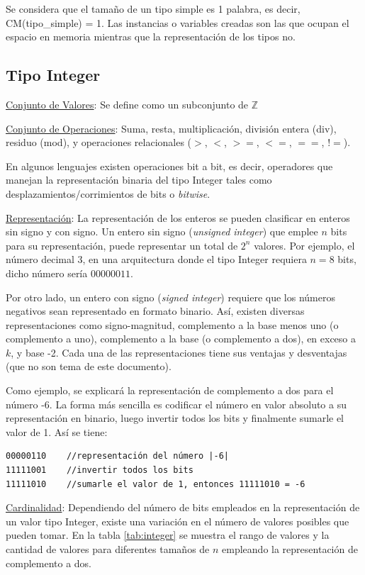 Se considera que el tamaño de un tipo simple es 1 palabra, es decir, CM(tipo\_simple) = 1. Las instancias o variables creadas son las que ocupan el espacio en memoria mientras que la representación de los tipos no.

\subsection{Tipo Integer}

\underline{Conjunto de Valores}: Se define como un subconjunto de $\mathbb{Z}$

\underline{Conjunto de Operaciones}: Suma, resta, multiplicación, división entera (div), residuo (mod), y operaciones relacionales ($>$, $<$, $>=$, $<=$, $==$, $!=$).

En algunos lenguajes existen operaciones bit a bit, es decir, operadores que manejan la representación binaria del tipo Integer tales como desplazamientos/corrimientos de bits o \textit{bitwise}.

\underline{Representación}: La representación de los enteros se pueden clasificar en enteros sin signo y con signo. Un entero sin signo (\textit{unsigned integer}) que emplee $n$ bits para su representación, puede representar un total de $2^n$ valores. Por ejemplo, el número decimal 3, en una arquitectura donde el tipo Integer requiera $n=8$ bits, dicho número sería $00000011$.

Por otro lado, un entero con signo (\textit{signed integer}) requiere que los números negativos sean representado en formato binario. Así, existen diversas representaciones como signo-magnitud, complemento a la base menos uno (o complemento a uno), complemento a la base (o complemento a dos), en exceso a $k$, y base -2. Cada una de las representaciones tiene sus ventajas y desventajas (que no son tema de este documento).

Como ejemplo, se explicará la representación de complemento a dos para el número -6. La forma más sencilla es codificar el número en valor absoluto a su representación en binario, luego invertir todos los bits y finalmente sumarle el valor de 1. Así se tiene:
\begin{lstlisting}[upquote=true,language=pseudo]
00000110 	//representación del número |-6|
11111001	//invertir todos los bits
11111010	//sumarle el valor de 1, entonces 11111010 = -6
\end{lstlisting}

\underline{Cardinalidad}: Dependiendo del número de bits empleados en la representación de un valor tipo Integer, existe una variación en el número de valores posibles que pueden tomar. En la tabla \ref{tab:integer} se muestra el rango de valores y la cantidad de valores para diferentes tamaños de $n$ empleando la representación de complemento a dos.

